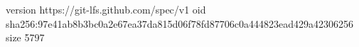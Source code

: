 version https://git-lfs.github.com/spec/v1
oid sha256:97e41ab8b3bc0a2e67ea37da815d06f78fd87706c0a444823ead429a42306256
size 5797
